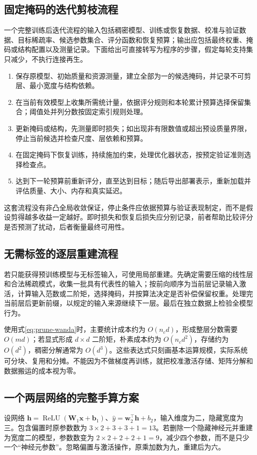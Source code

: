 \documentclass[UTF8,12pt,a4paper,fontset=fandol]{ctexart}
\begin{document}
\subsection{固定掩码的迭代剪枝流程}
一个完整训练后迭代流程的输入包括稠密模型、训练或恢复数据、校准与验证数据、目标稀疏率、候选参数集合、评分函数和恢复预算；输出应包括最终权重、掩码或结构配置以及测量记录。下面给出可直接转写为程序的步骤，假定每轮支持集只减少，不执行连接再生。
\begin{enumerate}
 \item 保存原模型、初始质量和资源测量，建立全部为一的候选掩码，并记录不可剪层、最小宽度与结构依赖。
 \item 在当前有效模型上收集所需统计量，依据评分规则和本轮累计预算选择保留集合；阈值处并列分数按固定索引规则处理。
 \item 更新掩码或结构，先测量即时损失；如出现非有限数值或超出预设质量界限，停止当前候选并检查尺度、层依赖和预算。
 \item 在固定掩码下恢复训练，持续施加约束，处理优化器状态，按预定验证准则选择检查点。
 \item 达到下一轮预算前重新评分，直至达到目标；随后导出部署表示，重新加载并评估质量、大小、内存和真实延迟。
\end{enumerate}
这套流程没有非凸全局收敛保证，停止条件应依据预算与验证表现制定，而不是假设剪得越多收益一定越好。即时损失和恢复后损失应分别记录，前者帮助比较评分是否预测了扰动，后者衡量最终可用性。

\subsection{无需标签的逐层重建流程}
若只能获得预训练模型与无标签输入，可使用局部重建。先确定需要压缩的线性层和合法稀疏模式，收集一批具有代表性的输入；按前向顺序为当前层记录输入激活，计算输入范数或二阶矩，选择掩码，并按算法决定是否补偿保留权重。处理完当前层后更新前缀，以规定的输入来源继续下一层。最后在独立数据上检验全模型行为。

使用式\eqref{eq:prune-wanda}时，主要统计成本约为 $O(n_cd)$，形成整层分数需要 $O(md)$；若显式形成 $d\times d$ 二阶矩，朴素成本约为 $O(n_cd^2)$，存储约为 $O(d^2)$，稠密分解通常为 $O(d^3)$。这些表达式只刻画基本运算规模，实际系统可分块、复用和分摊。不能因为不做梯度再训练，就把校准激活存储、矩阵分解和数据搬运的成本视为零。

\subsection{一个两层网络的完整手算方案}
设网络 $\mathbf h=\operatorname{ReLU}(\mathbf W_1\mathbf x+\mathbf b_1)$、$\widehat y=\mathbf w_2^\top\mathbf h+b_2$，输入维度为二，隐藏宽度为三。包含偏置时原参数数为 $3\times2+3+3+1=13$。若删除一个隐藏神经元并重建为宽度二的模型，参数数变为 $2\times2+2+2+1=9$，减少四个参数，而不是只少一个“神经元参数”。忽略偏置与激活操作，原乘加数为九，重建后为六。
\end{document}
